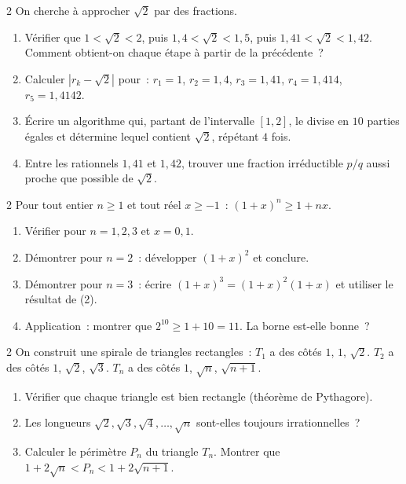 \begin{probleme}{2}
On cherche \`a approcher $\sqrt{2}$ par des fractions.
\begin{enumerate}
  \item V\'erifier que $1 < \sqrt{2} < 2$, puis $1{,}4 < \sqrt{2} < 1{,}5$,
        puis $1{,}41 < \sqrt{2} < 1{,}42$.
        Comment obtient-on chaque \'etape \`a partir de la pr\'ec\'edente~?
  \item Calculer $|r_k - \sqrt{2}|$ pour~:
        $r_1=1$, $r_2=1{,}4$, $r_3=1{,}41$, $r_4=1{,}414$, $r_5=1{,}4142$.
  \item \'Ecrire un algorithme qui, partant de l'intervalle $[1,2]$,
        le divise en $10$ parties \'egales et d\'etermine lequel contient
        $\sqrt{2}$, r\'ep\'etant $4$ fois. \computer
  \item Entre les rationnels $1{,}41$ et $1{,}42$, trouver une fraction
        irr\'eductible $p/q$ aussi proche que possible de $\sqrt{2}$.
\end{enumerate}
\end{probleme}

\begin{probleme}{2}
Pour tout entier $n \geq 1$ et tout r\'eel $x \geq -1$~:
$(1+x)^n \geq 1 + nx$.
\begin{enumerate}
  \item V\'erifier pour $n=1,2,3$ et $x=0{,}1$.
  \item D\'emontrer pour $n=2$~: d\'evelopper $(1+x)^2$ et conclure.
  \item D\'emontrer pour $n=3$~: \'ecrire $(1+x)^3 = (1+x)^2(1+x)$
        et utiliser le r\'esultat de (2).
  \item Application~: montrer que $2^{10} \geq 1 + 10 = 11$.
        La borne est-elle bonne~?
\end{enumerate}
\end{probleme}

\begin{probleme}{2}
On construit une spirale de triangles rectangles~:
$T_1$ a des c\^ot\'es $1$, $1$, $\sqrt{2}$.
$T_2$ a des c\^ot\'es $1$, $\sqrt{2}$, $\sqrt{3}$.
$T_n$ a des c\^ot\'es $1$, $\sqrt{n}$, $\sqrt{n+1}$.
\begin{enumerate}
  \item V\'erifier que chaque triangle est bien rectangle
        (th\'eor\`eme de Pythagore).
  \item Les longueurs $\sqrt{2},\sqrt{3},\sqrt{4},\ldots,\sqrt{n}$
        sont-elles toujours irrationnelles~?
  \item Calculer le p\'erim\`etre $P_n$ du triangle $T_n$.
        Montrer que $1+2\sqrt{n} < P_n < 1+2\sqrt{n+1}$.
\end{enumerate}
\end{probleme}

